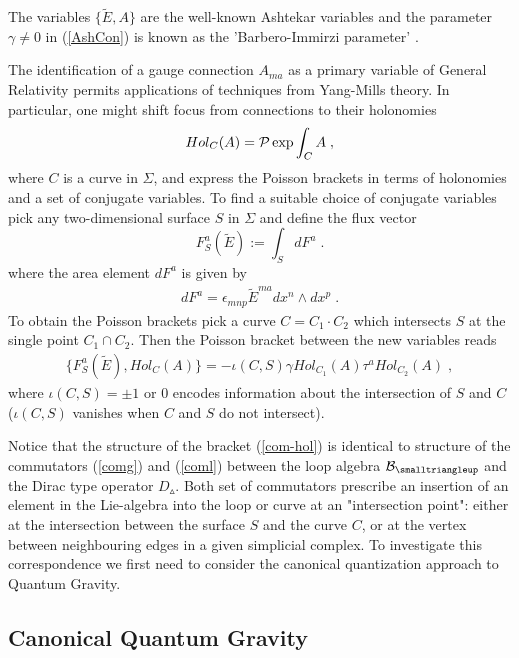 \documentclass[12pt]{article}
\newcommand{\ba}{\begin{eqnarray}}
\newcommand{\ea}{\end{eqnarray}}
\def\e{\epsilon}
\def\t{\tau}
\def\cb{{\cal B}}
\def\cp{{\cal P}}
\begin{document}
The variables $\{ \tilde{E},A\}$ are the well-known Ashtekar variables \cite{Ashtekar:1986yd,Ashtekar:1987gu} and the parameter $\gamma\not=0$ in (\ref{AshCon}) is known as the 'Barbero-Immirzi parameter' \cite{Barbero,Immirzi}. 

The identification of a gauge connection $A_{ma}$ as a primary variable of General Relativity permits applications of techniques from Yang-Mills theory. In particular, one might shift focus from connections to their holonomies \cite{Rovelli:1987df}
\[
Hol_{C}(A)=\cp \exp\int_C A\;,
\]
where $C$ is a curve in $\Sigma$, and express the Poisson brackets in terms of holonomies and a set of conjugate variables. To find a suitable choice of conjugate variables pick any two-dimensional surface $S$ in $\Sigma$ and define the flux vector
\[
F^a_S(\tilde{E}):= \int_S dF^a\;.
\]
where the area element $dF^a$ is given by
\ba 
dF^a=\e_{mnp}\tilde{E}^{ma} dx^n\wedge dx^p\;.
\label{areaelement}
\ea
To obtain the Poisson brackets pick a curve $C=C_1\cdot C_2$ which intersects $S$ at the single point $C_1\cap C_2$. Then the Poisson bracket between the new variables reads \cite{Ashtekar:1998ak}
\ba
\{ F^a_S(\tilde{ E}),Hol_C(A)  \}= - \iota(C,S) \gamma Hol_{C_1}(A)\t^a Hol_{C_2}(A)\;,
\label{com-hol}
\ea
where $\iota(C,S)=\pm 1$ or $0$ encodes information about the intersection of $S$ and $C$ ($\iota(C,S)$ vanishes when $C$ and $S$ do not intersect).

Notice that the structure of the bracket (\ref{com-hol}) is identical to structure of the commutators (\ref{comg}) and (\ref{coml}) between the loop algebra $\cb_{\smalltriangleup}$ and the Dirac type operator $D_{\smalltriangleup}$. Both set of  commutators prescribe an insertion of an element in the Lie-algebra into the loop or curve at an "intersection point": either at the intersection between the surface $S$ and the curve $C$, or at the vertex between neighbouring edges in a given simplicial complex. To investigate this correspondence we first need to consider the canonical quantization approach to Quantum Gravity. 


\subsection{Canonical Quantum Gravity}
\label{canqua}
\end{document}
